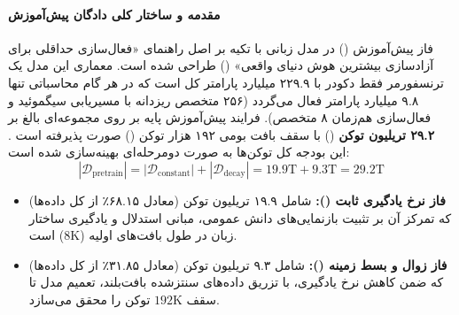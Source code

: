 \item {}

\paragraph*{مقدمه و ساختار کلی دادگان پیش‌آموزش}
فاز پیش‌آموزش () در مدل زبانی  با تکیه بر اصل راهنمای «فعال‌سازی حداقلی برای آزادسازی بیشترین هوش دنیای واقعی» () طراحی شده است. معماری این مدل یک ترنسفورمر فقط دکودر با ۲۲۹.۹ میلیارد پارامتر کل است که در هر گام محاسباتی تنها ۹.۸ میلیارد پارامتر فعال می‌گردد (۲۵۶ متخصص ریزدانه با مسیریابی سیگموئید و فعال‌سازی هم‌زمان ۸ متخصص). فرایند پیش‌آموزش پایه بر روی مجموعه‌ای بالغ بر \textbf{۲۹.۲ تریلیون توکن} () با سقف بافت بومی ۱۹۲ هزار توکن () صورت پذیرفته است \cite{minimax2026m2}. این بودجه کل توکن‌ها به صورت دومرحله‌ای بهینه‌سازی شده است:
\begin{equation}
    |\mathcal{D}_{\text{pretrain}}| = |\mathcal{D}_{\text{constant}}| + |\mathcal{D}_{\text{decay}}| = 19.9\text{T} + 9.3\text{T} = 29.2\text{T}
\end{equation}
\begin{itemize}
    \item \textbf{فاز نرخ یادگیری ثابت ():} شامل ۱۹.۹ تریلیون توکن (معادل ۶۸.۱۵٪ از کل داده‌ها) که تمرکز آن بر تثبیت بازنمایی‌های دانش عمومی، مبانی استدلال و یادگیری ساختار زبان در طول بافت‌های اولیه ($8\text{K}$) است.
    \item \textbf{فاز زوال و بسط زمینه ():} شامل ۹.۳ تریلیون توکن (معادل ۳۱.۸۵٪ از کل داده‌ها) که ضمن کاهش نرخ یادگیری، با تزریق داده‌های سنتز‌شده بافت‌بلند، تعمیم مدل تا سقف $192\text{K}$ توکن را محقق می‌سازد.
\end{itemize}


